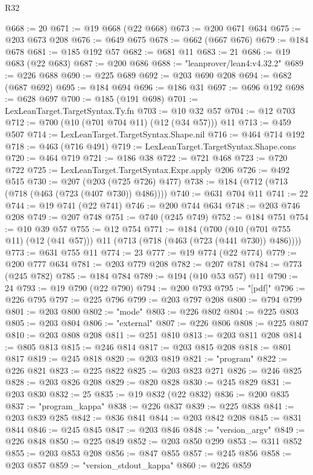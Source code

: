 \begin{lexlean}{R32}
\begin{coremodule}
@668 := 20
@671 := @19 @668 (@22 @668)
@673 := @200 @671 @634
@675 := @203 @673 @208
@676 := @649 @675
@678 := @662 (@667 @676)
@679 := @184 @678
@681 := @185 @192 @57
@682 := @681 @11
@683 := 21
@686 := @19 @683 (@22 @683)
@687 := @200 @686
@688 := "leanprover/lean4:v4.32.2"
@689 := @226 @688
@690 := @225 @689
@692 := @203 @690 @208
@694 := @682 (@687 @692)
@695 := @184 @694
@696 := @186 @31
@697 := @696 @192
@698 := @628 @697
@700 := @185 (@191 @698)
@701 := LexLeanTarget.TargetSyntax.Ty.fn
@703 := @10 @32 @57
@704 := @12 @703
@712 := @700 (@10 (@701 @704 @11) (@12 (@34 @57))) @11
@713 := @459 @507
@714 := LexLeanTarget.TargetSyntax.Shape.nil
@716 := @464 @714 @192
@718 := @463 (@716 @491)
@719 := LexLeanTarget.TargetSyntax.Shape.cons
@720 := @464 @719
@721 := @186 @38
@722 := @721 @468
@723 := @720 @722
@725 := LexLeanTarget.TargetSyntax.Expr.apply @206
@726 := @492 @515
@730 := @207 (@203 (@725 @726) @477)
@738 := @184 (@712 (@713 (@718 (@463 (@723 (@407 @730)) @486))))
@740 := @631 @704 @11
@741 := 22
@744 := @19 @741 (@22 @741)
@746 := @200 @744 @634
@748 := @203 @746 @208
@749 := @207 @748
@751 := @740 (@245 @749)
@752 := @184 @751
@754 := @10 @39 @57
@755 := @12 @754
@771 := @184
    (@700 (@10 (@701 @755 @11) (@12 (@41 @57))) @11 (@713 (@718 (@463 (@723 (@441 @730)) @486))))
@773 := @631 @755 @11
@774 := 23
@777 := @19 @774 (@22 @774)
@779 := @200 @777 @634
@781 := @203 @779 @208
@782 := @207 @781
@784 := @773 (@245 @782)
@785 := @184 @784
@789 := @194 (@10 @53 @57) @11
@790 := 24
@793 := @19 @790 (@22 @790)
@794 := @200 @793
@795 := "[pdf]"
@796 := @226 @795
@797 := @225 @796
@799 := @203 @797 @208
@800 := @794 @799
@801 := @203 @800
@802 := "mode"
@803 := @226 @802
@804 := @225 @803
@805 := @203 @804
@806 := "external"
@807 := @226 @806
@808 := @225 @807
@810 := @203 @808 @208
@811 := @251 @810
@813 := @203 @811 @208
@814 := @805 @813
@815 := @246 @814
@817 := @203 @815 @208
@818 := @801 @817
@819 := @245 @818
@820 := @203 @819
@821 := "program"
@822 := @226 @821
@823 := @225 @822
@825 := @203 @823 @271
@826 := @246 @825
@828 := @203 @826 @208
@829 := @820 @828
@830 := @245 @829
@831 := @203 @830
@832 := 25
@835 := @19 @832 (@22 @832)
@836 := @200 @835
@837 := "program_kappa"
@838 := @226 @837
@839 := @225 @838
@841 := @203 @839 @285
@842 := @836 @841
@844 := @203 @842 @208
@845 := @831 @844
@846 := @245 @845
@847 := @203 @846
@848 := "version_argv"
@849 := @226 @848
@850 := @225 @849
@852 := @203 @850 @299
@853 := @311 @852
@855 := @203 @853 @208
@856 := @847 @855
@857 := @245 @856
@858 := @203 @857
@859 := "version_stdout_kappa"
@860 := @226 @859

\end{coremodule}
\end{lexlean}
